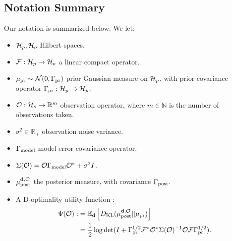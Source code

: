 \subsection{Notation Summary}\label{subsec:notation}
  Our notation is summarized below. We let:
  \begin{itemize}
  \item $\mathcal{H}_p, \mathcal{H}_o$ Hilbert spaces.
  \item $\mathcal{F}:\mathcal{H}_p \to \mathcal{H}_o$ a linear compact operator.
  \item $\mu_{\textup{pr}} \sim \mathcal{N}(0, \Gamma_{\textup{pr}})$ prior Gaussian measure on
    $\mathcal{H}_p$, with prior covariance operator $\Gamma_{\textup{pr}}:\mathcal{H}_p \to \mathcal{H}_p$.
  \item $\mathcal{O}: \mathcal{H}_o \to \mathbb{R}^m$ observation operator, where $m
    \in \mathbb{N}$ is the number of observations taken. 
  \item $\sigma^2 \in \mathbb{R}_{+}$ observation noise variance.
  \item $\Gamma_{\textup{model}}$ model error covariance operator.
  \item $\Sigma(\mathcal{O}) = \mathcal{O} \Gamma_{\textup{model}} \mathcal{O}^* + \sigma^2I$. 
  \item $\mu_{\textup{post}}^{\mathbf{d}, \mathcal{O}}$ the posterior measure, with covariance $\Gamma_{\textup{post}}$.
  \item A D-optimality utility function
    \cite{AlexanderianGloorGhattas14}:
    \begin{align*}
      \begin{split}
        \tar(\obs) :&= \mathbb{E}_{\data}\left [ D_{\text{KL}} (\post || \pr ) \right ] \\
        &= \frac12 \log \det ( I + \prcov^{1/2} \fwd ^* \obs^* \Sigma(\obs)^{-1} \obs
        \fwd \prcov^{1/2}).
      \end{split}
    \end{align*}
  \end{itemize}



